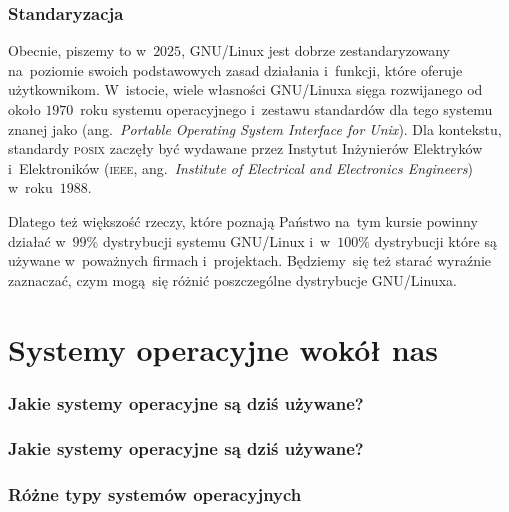 \documentclass[10pt,t]{beamer}
\begin{document}
\begin{frame}
  \frametitle{Standaryzacja}


  Obecnie, piszemy to w~$2025$, GNU/Linux jest dobrze zestandaryzowany
  na~poziomie swoich podstawowych zasad działania i~funkcji, które oferuje
  użytkownikom. W~istocie, wiele własności GNU/Linuxa sięga rozwijanego od
  około $1970$~roku systemu operacyjnego
   i~zestawu
  standardów dla tego systemu znanej jako
  (ang.~\textit{Portable Operating System Interface for Unix}). Dla
  kontekstu, standardy \textsc{posix} zaczęły być wydawane przez Instytut
  Inżynierów Elektryków i~Elektroników (\textsc{ieee},
  ang.~\textit{Institute of Electrical and Electronics Engineers})
  w~roku~$1988$.

  Dlatego też większość rzeczy, które poznają Państwo na~tym kursie powinny
  działać w~$99\%$ dystrybucji systemu GNU/Linux i~w~$100\%$ dystrybucji
  które są używane w~poważnych firmach i~projektach. Będziemy~się też
  starać wyraźnie zaznaczać, czym mogą~się różnić poszczególne dystrybucje
  GNU/Linuxa.

\end{frame}



\section{Systemy operacyjne wokół nas}


\begin{frame}
  \frametitle{Jakie systemy operacyjne są dziś używane?}



\end{frame}





\begin{frame}
  \frametitle{Jakie systemy operacyjne są dziś używane?}



\end{frame}





\begin{frame}
  \frametitle{Różne typy systemów operacyjnych}



\end{frame}
\end{document}

